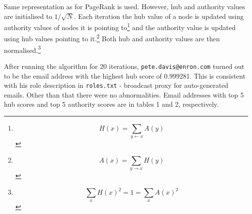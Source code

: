 \documentclass{tufte-handout}
\begin{document}
Same representation as for PageRank is used. However, hub and authority
values are initialised to $1/\sqrt{N}$. Each iteration the hub value of
a node is updated using authority values of nodes it is pointing
to\footnote{\[H(x) = \sum_{y \leftarrow x} A(y)\]} and the authority
value is updated using hub values pointing to it.\footnote{\[A(x) = \sum_{y \rightarrow x} H(y)\]}
Both hub and authority values are then normalised.\footnote{\[\sum_{x} H(x)^2 = 1 = \sum_{x} A(x)^2\]}

After running the algorithm for 20 iterations,
\texttt{pete.davis@enron.com} turned out to be the email address with
the highest hub score of 0.999281. This is consistent with his role
description in \texttt{roles.txt} - broadcast proxy for auto-generated
emails. Other than that there were no abnormalities. Email addresses
with top 5 hub scores and top 5 authority scores are in tables 1 and 2,
respectively.
\end{document}
